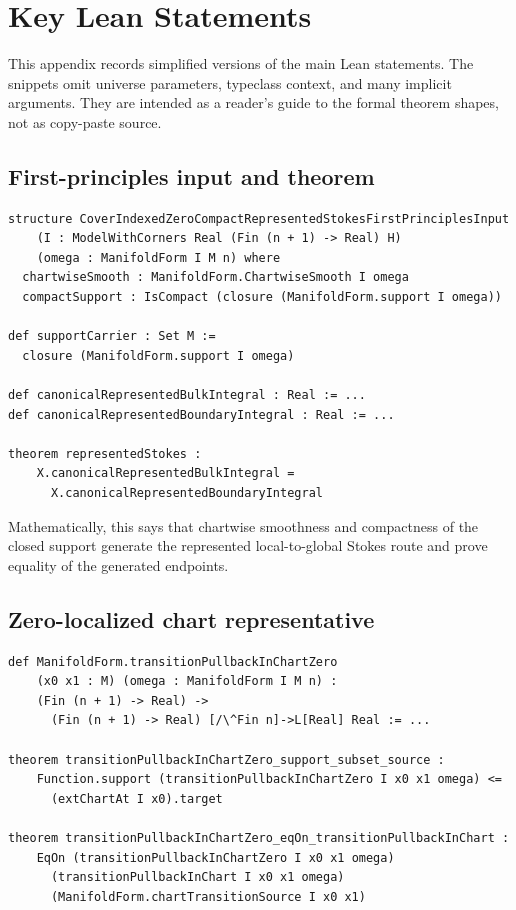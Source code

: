 \section{Key Lean Statements}
\label{app:key-statements}

This appendix records simplified versions of the main Lean statements.  The
snippets omit universe parameters, typeclass context, and many implicit
arguments.  They are intended as a reader's guide to the formal theorem shapes,
not as copy-paste source.

\subsection{First-principles input and theorem}

\begin{lstlisting}[language=Lean,basicstyle=\ttfamily\footnotesize]
structure CoverIndexedZeroCompactRepresentedStokesFirstPrinciplesInput
    (I : ModelWithCorners Real (Fin (n + 1) -> Real) H)
    (omega : ManifoldForm I M n) where
  chartwiseSmooth : ManifoldForm.ChartwiseSmooth I omega
  compactSupport : IsCompact (closure (ManifoldForm.support I omega))

def supportCarrier : Set M :=
  closure (ManifoldForm.support I omega)

def canonicalRepresentedBulkIntegral : Real := ...
def canonicalRepresentedBoundaryIntegral : Real := ...

theorem representedStokes :
    X.canonicalRepresentedBulkIntegral =
      X.canonicalRepresentedBoundaryIntegral
\end{lstlisting}

Mathematically, this says that chartwise smoothness and compactness of the
closed support generate the represented local-to-global Stokes route and prove
equality of the generated endpoints.

\subsection{Zero-localized chart representative}

\begin{lstlisting}[language=Lean,basicstyle=\ttfamily\footnotesize]
def ManifoldForm.transitionPullbackInChartZero
    (x0 x1 : M) (omega : ManifoldForm I M n) :
    (Fin (n + 1) -> Real) ->
      (Fin (n + 1) -> Real) [/\^Fin n]->L[Real] Real := ...

theorem transitionPullbackInChartZero_support_subset_source :
    Function.support (transitionPullbackInChartZero I x0 x1 omega) <=
      (extChartAt I x0).target

theorem transitionPullbackInChartZero_eqOn_transitionPullbackInChart :
    EqOn (transitionPullbackInChartZero I x0 x1 omega)
      (transitionPullbackInChart I x0 x1 omega)
      (ManifoldForm.chartTransitionSource I x0 x1)
\end{lstlisting}

